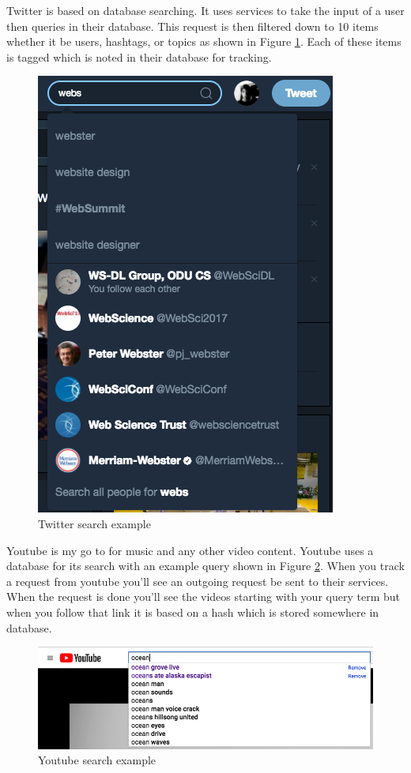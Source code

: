 \documentclass[letterpaper,11pt]{article}
\begin{document}
Twitter is based on database searching. It uses services to take the input of a user then queries in their database.
This request is then filtered down to 10 items whether it be users, hashtags, or topics as shown in Figure \ref{fig:twitter}.
Each of these items is tagged which is noted in their database for tracking.

\begin{figure}[h]
\centering
\includegraphics[scale=0.35]{twitter.png}
\caption{Twitter search example}
\label{fig:twitter}
\end{figure}

Youtube is my go to for music and any other video content. 
Youtube uses a database for its search with an example query shown in Figure \ref{fig:youtube}. 
When you track a request from youtube you'll see an outgoing request be sent to their services. 
When the request is done you'll see the videos starting with your query term but when you follow that link it is based on a hash which is stored somewhere in database.

\begin{figure}[h]
\centering
\includegraphics[scale=0.35]{youtube.png}
\caption{Youtube search example}
\label{fig:youtube}
\end{figure}
\end{document}

